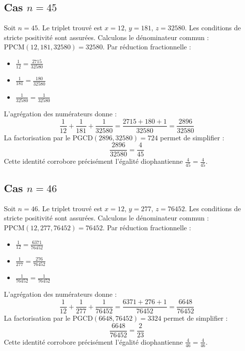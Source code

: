 \documentclass[11pt,a4paper]{article}
\begin{document}
\subsection{Cas $n = 45$}
Soit $n = 45$. Le triplet trouvé est $x = 12$, $y = 181$, $z = 32580$.
Les conditions de stricte positivité sont assurées.
Calculons le dénominateur commun : $\text{PPCM}(12, 181, 32580) = 32580$.
Par réduction fractionnelle :
\begin{itemize}
    \item $\frac{1}{12} = \frac{2715}{32580}$
    \item $\frac{1}{181} = \frac{180}{32580}$
    \item $\frac{1}{32580} = \frac{1}{32580}$
\end{itemize}
L'agrégation des numérateurs donne :
$$ \frac{1}{12} + \frac{1}{181} + \frac{1}{32580} = \frac{2715 + 180 + 1}{32580} = \frac{2896}{32580} $$
La factorisation par le $\text{PGCD}(2896, 32580) = 724$ permet de simplifier :
$$ \frac{2896}{32580} = \frac{4}{45} $$
Cette identité corrobore précisément l'égalité diophantienne $\frac{4}{45} = \frac{4}{45}$.

\subsection{Cas $n = 46$}
Soit $n = 46$. Le triplet trouvé est $x = 12$, $y = 277$, $z = 76452$.
Les conditions de stricte positivité sont assurées.
Calculons le dénominateur commun : $\text{PPCM}(12, 277, 76452) = 76452$.
Par réduction fractionnelle :
\begin{itemize}
    \item $\frac{1}{12} = \frac{6371}{76452}$
    \item $\frac{1}{277} = \frac{276}{76452}$
    \item $\frac{1}{76452} = \frac{1}{76452}$
\end{itemize}
L'agrégation des numérateurs donne :
$$ \frac{1}{12} + \frac{1}{277} + \frac{1}{76452} = \frac{6371 + 276 + 1}{76452} = \frac{6648}{76452} $$
La factorisation par le $\text{PGCD}(6648, 76452) = 3324$ permet de simplifier :
$$ \frac{6648}{76452} = \frac{2}{23} $$
Cette identité corrobore précisément l'égalité diophantienne $\frac{4}{46} = \frac{4}{46}$.
\end{document}
